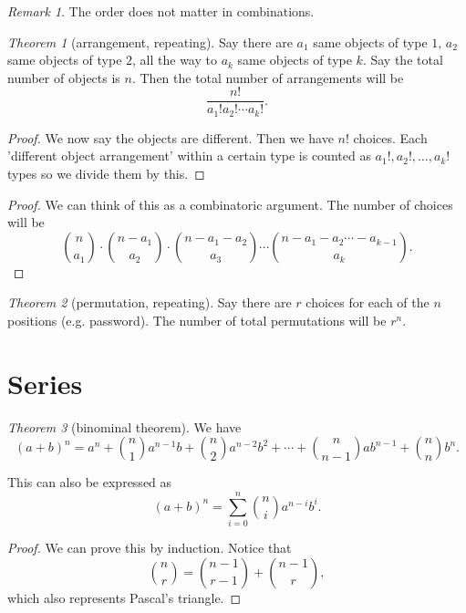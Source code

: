 \documentclass[8pt]{article}
\theoremstyle{remark}
\newtheorem{theorem}{Theorem}[section]
\newtheorem*{remark}{Remark}
\begin{document}
        \begin{remark}
            The order does not matter in combinations.
        \end{remark}

        \begin{theorem}[arrangement, repeating]
            Say there are $a_1$ same objects of type $1$, $a_2$ same objects of type $2$, all the way to $a_k$ same objects of type $k$. Say the total number of objects is $n$. Then the total number of arrangements will be
            $$
                \frac{n!}{a_1! a_2! \cdots a_k!}.
            $$
            \begin{proof}
                We now say the objects are different. Then we have $n!$ choices. Each 'different object arrangement' within a certain type is counted as $a_1!, a_2!, \ldots, a_k!$ types so we divide them by this.
            \end{proof}
            \begin{proof}
                We can think of this as a combinatoric argument. The number of choices will be
                $$
                    \binom{n}{a_1} \cdot \binom{n - a_1}{a_2} \cdot \binom{n - a_1 - a_2}{a_3} \cdots \binom{n - a_1 - a_2 \cdots - a_{k - 1}}{a_k}.
                $$
            \end{proof}
        \end{theorem}

        \begin{theorem}[permutation, repeating]
            Say there are $r$ choices for each of the $n$ positions (e.g. password). The number of total permutations will be $r^n$.
        \end{theorem}

    \section{Series}

        \begin{theorem}[binominal theorem]
            We have
            $$
                (a + b)^n = a^n + \binom{n}{1} a^{n - 1}b + \binom{n}{2} a^{n - 2}b^2 + \cdots + \binom{n}{n - 1} a b^{n - 1} + \binom{n}{n} b^n.
            $$
            
            This can also be expressed as
            $$
                (a + b)^n = \sum_{i = 0}^{n} \binom{n}{i} a^{n - i} b^i.
            $$

            \begin{proof}
                We can prove this by induction. Notice that
                $$
                    \binom{n}{r} = \binom{n - 1}{r - 1} + \binom{n - 1}{r},
                $$
                which also represents Pascal's triangle.
            \end{proof}
        \end{theorem}
\end{document}

